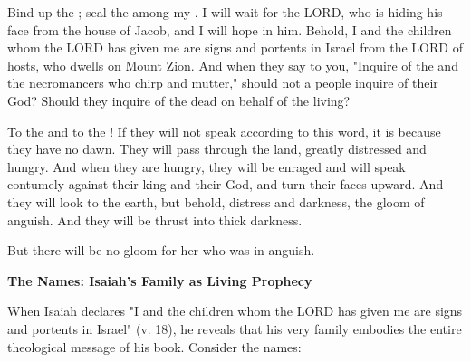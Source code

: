 \documentclass[11pt]{article}
\begin{document}
\begin{biblicaloutline}[Isaiah 8:16-9:1a]
    \begin{versesection}{2em}
         Bind up the ; seal the  among my . I will wait for the LORD, who is hiding his face from the house of Jacob, and I will hope in him.  Behold, I and the children whom the LORD has given me are signs and portents in Israel from the LORD of hosts, who dwells on Mount Zion.  And when they say to you, "Inquire of the  and the necromancers who chirp and mutter," should not a people inquire of their God? Should they inquire of the dead on behalf of the living?
    \end{versesection}

    \begin{versesection}{2em}
         To the  and to the ! If they will not speak according to this word, it is because they have no dawn.  They will pass through the land, greatly distressed and hungry. And when they are hungry, they will be enraged and will speak contumely against their king and their God, and turn their faces upward.  And they will look to the earth, but behold, distress and darkness, the gloom of anguish. And they will be thrust into thick darkness.

         But there will be no gloom for her who was in anguish.
    \end{versesection}

\end{biblicaloutline}

\newpage
{\large\bfseries The Names: Isaiah's Family as Living Prophecy}
\vspace{1em}

When Isaiah declares "I and the children whom the LORD has given me are signs and portents in Israel" (v. 18), he reveals that his very family embodies the entire theological message of his book. Consider the names:

\end{document}
